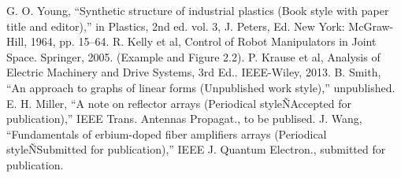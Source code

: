 \documentclass[a4paper, 10pt, onecolumn,journal]{ieeeconf}
\begin{document}
\begin{thebibliography}{99}

 G. O. Young, ``Synthetic structure of industrial plastics (Book style with paper title and editor),'' 	in Plastics, 2nd ed. vol. 3, J. Peters, Ed.  New York: McGraw-Hill, 1964, pp. 15--64.
 R. Kelly et al, Control of Robot Manipulators in Joint Space. Springer, 2005. (Example and Figure 2.2).
 P. Krause et al, Analysis of Electric Machinery and Drive Systems, 3rd Ed.. IEEE-Wiley, 2013.
 B. Smith, ``An approach to graphs of linear forms (Unpublished work style),'' unpublished.
 E. H. Miller, ``A note on reflector arrays (Periodical styleÑAccepted for publication),'' IEEE Trans. Antennas Propagat., to be publised.
 J. Wang, ``Fundamentals of erbium-doped fiber amplifiers arrays (Periodical styleÑSubmitted for publication),'' IEEE J. Quantum Electron., submitted for publication.

\end{thebibliography}
\end{document}
